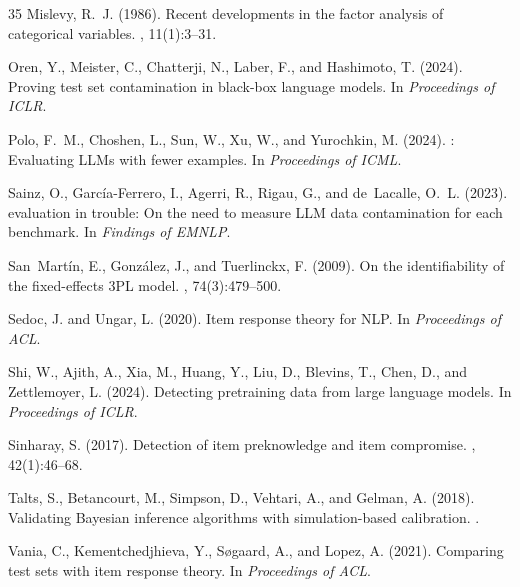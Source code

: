 \documentclass[letterpaper,11pt]{article}
\begin{document}
\begin{thebibliography}{35}
Mislevy, R.~J. (1986).
\newblock Recent developments in the factor analysis of categorical variables.
, 11(1):3--31.

Oren, Y., Meister, C., Chatterji, N., Laber, F., and Hashimoto, T. (2024).
\newblock Proving test set contamination in black-box language models.
\newblock In {\em Proceedings of ICLR}.

Polo, F.~M., Choshen, L., Sun, W., Xu, W., and Yurochkin, M. (2024).
: Evaluating {LLMs} with fewer examples.
\newblock In {\em Proceedings of ICML}.

Sainz, O., Garc{\'i}a-Ferrero, I., Agerri, R., Rigau, G., and de~Lacalle, O.~L. (2023).
 evaluation in trouble: On the need to measure {LLM} data contamination for each benchmark.
\newblock In {\em Findings of EMNLP}.

San~Mart{\'i}n, E., Gonz{\'a}lez, J., and Tuerlinckx, F. (2009).
\newblock On the identifiability of the fixed-effects 3PL model.
, 74(3):479--500.

Sedoc, J. and Ungar, L. (2020).
\newblock Item response theory for {NLP}.
\newblock In {\em Proceedings of ACL}.

Shi, W., Ajith, A., Xia, M., Huang, Y., Liu, D., Blevins, T., Chen, D., and Zettlemoyer, L. (2024).
\newblock Detecting pretraining data from large language models.
\newblock In {\em Proceedings of ICLR}.

Sinharay, S. (2017).
\newblock Detection of item preknowledge and item compromise.
, 42(1):46--68.

Talts, S., Betancourt, M., Simpson, D., Vehtari, A., and Gelman, A. (2018).
\newblock Validating {Bayesian} inference algorithms with simulation-based calibration.
.

Vania, C., Kementchedjhieva, Y., S{\o}gaard, A., and Lopez, A. (2021).
\newblock Comparing test sets with item response theory.
\newblock In {\em Proceedings of ACL}.


\end{thebibliography}
\end{document}
